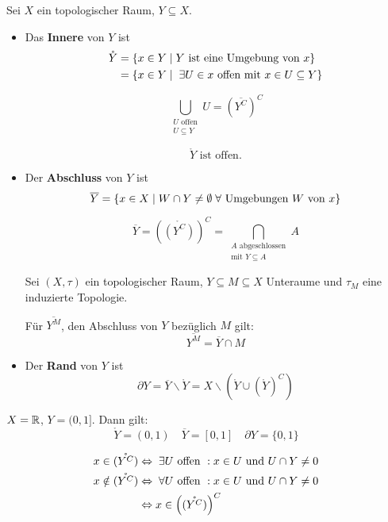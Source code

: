 \documentclass[main.tex]{subfiles}
\begin{document}
\begin{Definition}
  Sei $X$ ein topologischer Raum, $Y \subseteq X$.
  \begin{itemize}
    \item Das \textbf{Innere} von $Y$ ist
      $$\begin{aligned}
        \mathring{Y} &= \{x \in Y \mid Y \text{ ist eine Umgebung von } x\}\\
        &= \{x \in Y \mid \;\exists U \in x \text{ offen mit } x \in U \subseteq Y\}
      \end{aligned}$$
      \begin{Bemerkung}
        $$\bigcup_{\substack{U \text{ offen} \\ U \subseteq Y}} U = \left( \overline{Y^C}\right)^C$$
      \end{Bemerkung}
      \begin{Theorem}
        $$\mathring{Y} \text{ ist offen.}$$
      \end{Theorem}
    \item Der \textbf{Abschluss} von $Y$ ist
      $$\overline{Y} = \{x \in X \mid W \cap Y \neq \emptyset \;\forall \text{ Umgebungen } W \text{ von } x\}$$
      \begin{Bemerkung}
        $$\overline{Y}= \left(\mathring{(Y^C)}\right)^C = \bigcap_{\substack{A \text{ abgeschlossen} \\ \text{mit } Y \subseteq A}} A$$
      \end{Bemerkung}
      \begin{Lemma}
        Sei $(X,\tau)$ ein topologischer Raum, $Y \subseteq M \subseteq X$ Unteraume und $\tau_M$ eine induzierte Topologie.

        Für $\overline{Y^M}$, den Abschluss von $Y$ bezüglich $M$ gilt:
        $$\overline{Y^M} = \overline{Y} \cap M$$
      \end{Lemma}
    \item Der \textbf{Rand} von $Y$ ist
      $$\partial Y = \overline{Y} \backslash \mathring{Y} = X \backslash \left(\mathring{Y} \cup (\mathring{Y})^C\right)$$
  \end{itemize}
\end{Definition}

\begin{Beispiel}
  $X = \mathbb{R}$, $Y = (0,1]$. Dann gilt:
  $$\mathring{Y} = (0,1) \quad \overline{Y} = [0,1] \quad \partial Y = \{0,1\}$$
\end{Beispiel}

\begin{Beweis}
  $$\begin{aligned}
    x \in \mathring{(Y^C)} & \Leftrightarrow \;\exists U \text{ offen }: x \in U \text{ und } U \cap Y \neq 0 \\
    x \notin \mathring{(Y^C)} & \Leftrightarrow \;\forall U \text{ offen }: x \in U \text{ und } U \cap Y \neq 0 \\
    & \Leftrightarrow x \in \left(\mathring{(Y^C)}\right)^C
  \end{aligned}$$
\end{Beweis}
\end{document}
